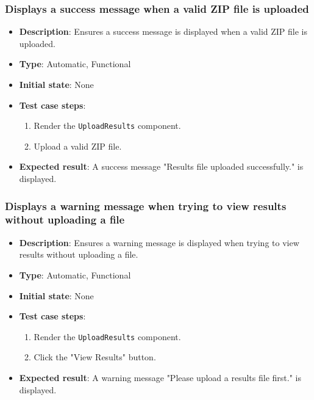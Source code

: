 \documentclass[12pt, titlepage]{article}
\begin{document}
\subsubsection{Displays a success message when a valid ZIP file is uploaded}
\begin{itemize}
    \item \textbf{Description}: Ensures a success message is displayed when a valid ZIP file is uploaded.
    \item \textbf{Type}: Automatic, Functional
    \item \textbf{Initial state}: None
    \item \textbf{Test case steps}:
    \begin{enumerate}
        \item Render the \texttt{UploadResults} component.
        \item Upload a valid ZIP file.
    \end{enumerate}
    \item \textbf{Expected result}: A success message "Results file uploaded successfully." is displayed.
\end{itemize}

\subsubsection{Displays a warning message when trying to view results without uploading a file}
\begin{itemize}
    \item \textbf{Description}: Ensures a warning message is displayed when trying to view results without uploading a file.
    \item \textbf{Type}: Automatic, Functional
    \item \textbf{Initial state}: None
    \item \textbf{Test case steps}:
    \begin{enumerate}
        \item Render the \texttt{UploadResults} component.
        \item Click the "View Results" button.
    \end{enumerate}
    \item \textbf{Expected result}: A warning message "Please upload a results file first." is displayed.
\end{itemize}
\end{document}
